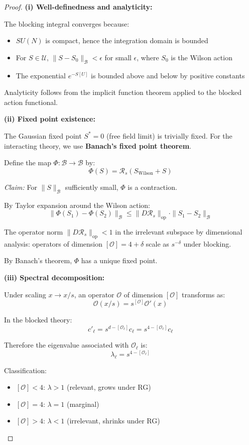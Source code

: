 \begin{proof}
\textbf{(i) Well-definedness and analyticity:}

The blocking integral converges because:
\begin{itemize}
\item $SU(N)$ is compact, hence the integration domain is bounded
\item For $S \in \mathcal{U}$, $\|S - S_0\|_{\mathcal{B}} < \epsilon$ for small $\epsilon$, 
where $S_0$ is the Wilson action
\item The exponential $e^{-S[U]}$ is bounded above and below by positive constants
\end{itemize}

Analyticity follows from the implicit function theorem applied to the 
blocked action functional.

\textbf{(ii) Fixed point existence:}

The Gaussian fixed point $S^* = 0$ (free field limit) is trivially fixed. 
For the interacting theory, we use \textbf{Banach's fixed point theorem}.

Define the map $\Phi: \mathcal{B} \to \mathcal{B}$ by:
\[
\Phi(S) = \mathcal{R}_s(S_{\text{Wilson}} + S)
\]

\textit{Claim:} For $\|S\|_{\mathcal{B}}$ sufficiently small, $\Phi$ is a contraction.

By Taylor expansion around the Wilson action:
\[
\|\Phi(S_1) - \Phi(S_2)\|_{\mathcal{B}} \leq \|D\mathcal{R}_s\|_{\text{op}} \cdot \|S_1 - S_2\|_{\mathcal{B}}
\]

The operator norm $\|D\mathcal{R}_s\|_{\text{op}} < 1$ in the irrelevant subspace 
by dimensional analysis: operators of dimension $[\mathcal{O}] = 4 + \delta$ 
scale as $s^{-\delta}$ under blocking.

By Banach's theorem, $\Phi$ has a unique fixed point.

\textbf{(iii) Spectral decomposition:}

Under scaling $x \to x/s$, an operator $\mathcal{O}$ of dimension $[\mathcal{O}]$ transforms as:
\[
\mathcal{O}(x/s) = s^{[\mathcal{O}]} \mathcal{O}'(x)
\]

In the blocked theory:
\[
c'_\ell = s^{d - [\mathcal{O}_\ell]} c_\ell = s^{4 - [\mathcal{O}_\ell]} c_\ell
\]

Therefore the eigenvalue associated with $\mathcal{O}_\ell$ is:
\[
\lambda_\ell = s^{4 - [\mathcal{O}_\ell]}
\]

Classification:
\begin{itemize}
\item $[\mathcal{O}] < 4$: $\lambda > 1$ (relevant, grows under RG)
\item $[\mathcal{O}] = 4$: $\lambda = 1$ (marginal)
\item $[\mathcal{O}] > 4$: $\lambda < 1$ (irrelevant, shrinks under RG)
\end{itemize}


\end{proof}

